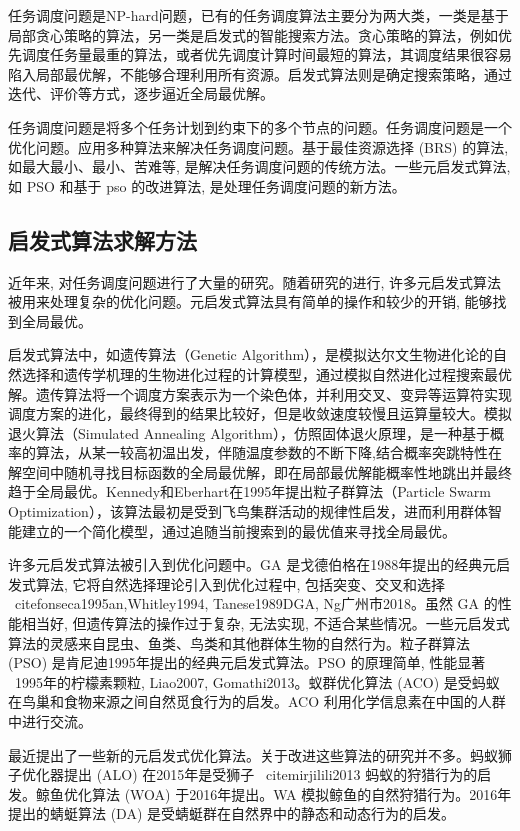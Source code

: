 任务调度问题是NP-hard问题，已有的任务调度算法主要分为两大类，一类是基于局部贪心策略的算法，另一类是启发式的智能搜索方法。贪心策略的算法，例如优先调度任务量最重的算法，或者优先调度计算时间最短的算法，其调度结果很容易陷入局部最优解，不能够合理利用所有资源。启发式算法则是确定搜索策略，通过迭代、评价等方式，逐步逼近全局最优解。

任务调度问题是将多个任务计划到约束下的多个节点的问题。任务调度问题是一个优化问题。应用多种算法来解决任务调度问题。基于最佳资源选择 (BRS) 的算法, 如最大最小、最小、苦难等, 是解决任务调度问题的传统方法。一些元启发式算法, 如 PSO 和基于 pso 的改进算法, 是处理任务调度问题的新方法。

\subsection{启发式算法求解方法}

近年来, 对任务调度问题进行了大量的研究。随着研究的进行, 许多元启发式算法被用来处理复杂的优化问题。元启发式算法具有简单的操作和较少的开销, 能够找到全局最优。

启发式算法中，如遗传算法（Genetic Algorithm），是模拟达尔文生物进化论的自然选择和遗传学机理的生物进化过程的计算模型，通过模拟自然进化过程搜索最优解。遗传算法将一个调度方案表示为一个染色体，并利用交叉、变异等运算符实现调度方案的进化，最终得到的结果比较好，但是收敛速度较慢且运算量较大。模拟退火算法（Simulated Annealing Algorithm），仿照固体退火原理，是一种基于概率的算法，从某一较高初温出发，伴随温度参数的不断下降,结合概率突跳特性在解空间中随机寻找目标函数的全局最优解，即在局部最优解能概率性地跳出并最终趋于全局最优。Kennedy和Eberhart在1995年提出粒子群算法（Particle Swarm Optimization），该算法最初是受到飞鸟集群活动的规律性启发，进而利用群体智能建立的一个简化模型，通过追随当前搜索到的最优值来寻找全局最优。

许多元启发式算法被引入到优化问题中。GA 是戈德伯格在1988年提出的经典元启发式算法, 它将自然选择理论引入到优化过程中, 包括突变、交叉和选择 \ citefonseca1995an,Whitley1994, Tanese1989DGA, Ng广州市2018。虽然 GA 的性能相当好, 但遗传算法的操作过于复杂, 无法实现, 不适合某些情况。一些元启发式算法的灵感来自昆虫、鱼类、鸟类和其他群体生物的自然行为。粒子群算法 (PSO) 是肯尼迪1995年提出的经典元启发式算法。PSO 的原理简单, 性能显著 \ 1995年的柠檬素颗粒, Liao2007, Gomathi2013。蚁群优化算法 (ACO) 是受蚂蚁在鸟巢和食物来源之间自然觅食行为的启发。ACO 利用化学信息素在中国的人群中进行交流。

最近提出了一些新的元启发式优化算法。关于改进这些算法的研究并不多。蚂蚁狮子优化器提出 (ALO) 在2015年是受狮子 \ citemirjilili2013 蚂蚁的狩猎行为的启发。鲸鱼优化算法 (WOA) 于2016年提出。WA 模拟鲸鱼的自然狩猎行为。2016年提出的蜻蜓算法 (DA) 是受蜻蜓群在自然界中的静态和动态行为的启发。


